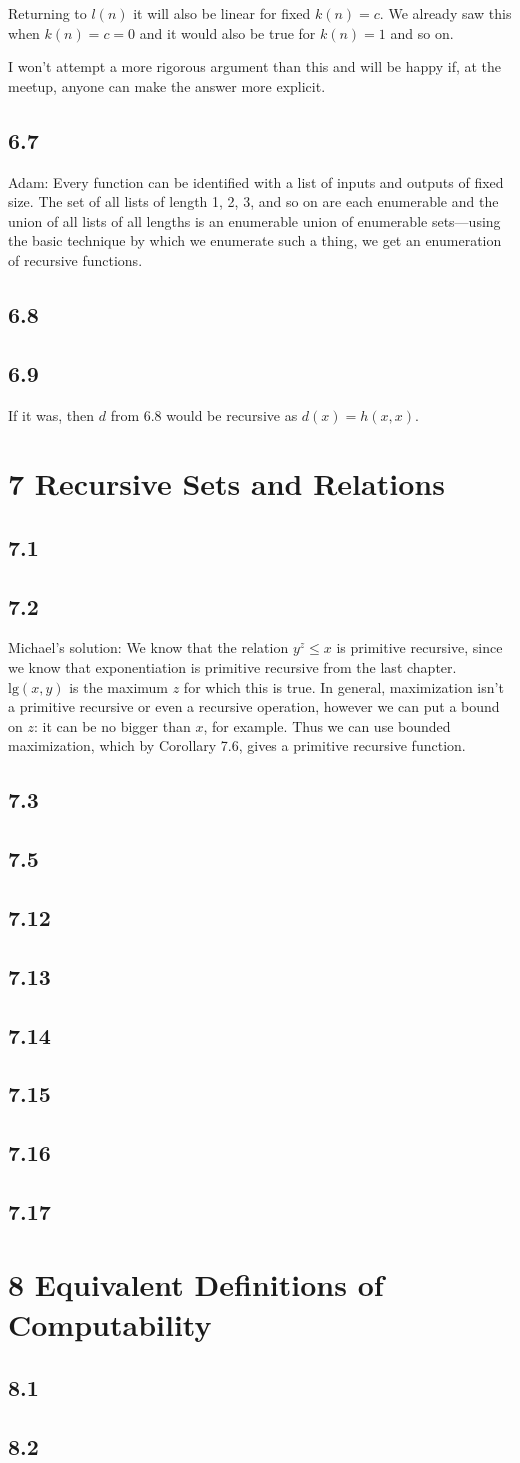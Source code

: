 \documentclass{article}
\newcommand\s{\section*}
\renewcommand\ss{\subsection*}
\newcommand\ms{Michael's solution: } %
\begin{document}
    Returning to $l(n)$ it will also be linear for fixed $k(n)=c$.  We already
    saw this when $k(n)=c=0$ and it would also be true for $k(n)=1$ and so on.

    I won't attempt a more rigorous argument than this and will be happy if, at
    the meetup, anyone can make the answer more explicit.
\ss{6.7} Adam: Every function can be identified with a list of inputs and outputs
    of fixed size.  The set of all lists of length 1, 2, 3, and so on are each
    enumerable and the union of all lists of all lengths is an enumerable union
    of enumerable sets---using the basic technique by which we enumerate such a
    thing, we get an enumeration of recursive functions.
\ss{6.8}
\ss{6.9}
If it was, then $d$ from 6.8 would be recursive as $d(x) = h(x,x)$.

\s{7 Recursive Sets and Relations}
\ss{7.1}
\ss{7.2}
\ms We know that the relation $y^z\leq x$ is primitive recursive, since we know that exponentiation is primitive recursive from the 
last chapter.  $\mathrm{lg}(x, y)$ is the maximum $z$ for which
this is true.  In general, maximization isn't a primitive recursive or even a recursive operation, however we can put a bound on $z$: it can be no bigger than $x$, for example.  Thus we can use bounded maximization, which by Corollary 7.6, gives a primitive recursive function.
\ss{7.3}
\ss{7.5}
\ss{7.12}
\ss{7.13}
\ss{7.14}
\ss{7.15}
\ss{7.16}
\ss{7.17}

\s{8 Equivalent Definitions of Computability}
\ss{8.1}
\ss{8.2}
\end{document}
